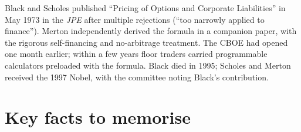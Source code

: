 \begin{historybox}
Black and Scholes published ``Pricing of Options and Corporate
Liabilities'' in May 1973 in the \emph{JPE} after multiple
rejections (``too narrowly applied to finance''). Merton
independently derived the formula in a companion paper, with
the rigorous self-financing and no-arbitrage treatment. The
CBOE had opened one month earlier; within a few years floor
traders carried programmable calculators preloaded with the
formula. Black died in 1995; Scholes and Merton received the
1997 Nobel, with the committee noting Black's contribution.
\end{historybox}

\section{Key facts to memorise}
\label{sec:ch15_keyfacts}

